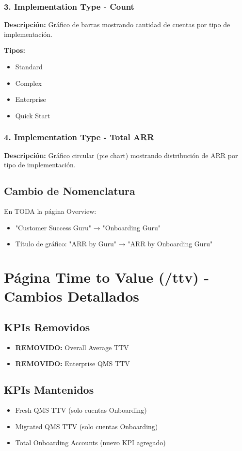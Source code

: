 \documentclass[12pt,a4paper]{article}
\begin{document}
\subsubsection{3. Implementation Type - Count}
\textbf{Descripción:} Gráfico de barras mostrando cantidad de cuentas por tipo de implementación.

\textbf{Tipos:}
\begin{itemize}
    \item Standard
    \item Complex
    \item Enterprise
    \item Quick Start
\end{itemize}

\subsubsection{4. Implementation Type - Total ARR}
\textbf{Descripción:} Gráfico circular (pie chart) mostrando distribución de ARR por tipo de implementación.

\subsection{Cambio de Nomenclatura}

En TODA la página Overview:
\begin{itemize}
    \item "Customer Success Guru" → "Onboarding Guru"
    \item Título de gráfico: "ARR by Guru" → "ARR by Onboarding Guru"
\end{itemize}

\section{Página Time to Value (/ttv) - Cambios Detallados}

\subsection{KPIs Removidos}
\begin{itemize}
    \item \textbf{REMOVIDO:} Overall Average TTV
    \item \textbf{REMOVIDO:} Enterprise QMS TTV
\end{itemize}

\subsection{KPIs Mantenidos}
\begin{itemize}
    \item Fresh QMS TTV (solo cuentas Onboarding)
    \item Migrated QMS TTV (solo cuentas Onboarding)
    \item Total Onboarding Accounts (nuevo KPI agregado)
\end{itemize}
\end{document}
